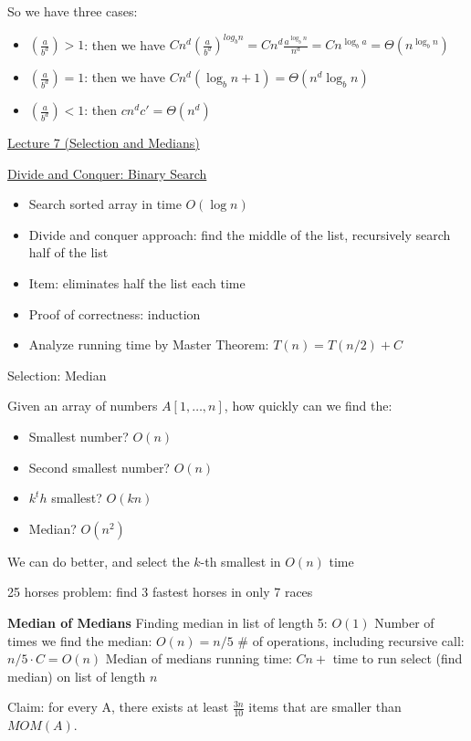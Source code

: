 \documentclass[12pt]{article}
\begin{document}
So we have three cases: \begin{itemize}
    \item $\left(\frac{a}{b^d}\right) > 1$: then we have $Cn^d \left(\frac{a}{b^d}\right)^{log_b n} = Cn^d \frac{a^{\log_bn}}{n^d} = Cn^{\log_b a} = \Theta(n^{\log_b n})$
    \item $\left(\frac{a}{b^d}\right) = 1$: then we have $Cn^d(\log_bn + 1) = \Theta(n^d \log_bn)$
    \item $\left(\frac{a}{b^d}\right) < 1$: then $cn^dc' = \Theta(n^d)$
\end{itemize}

\underline{Lecture 7 (Selection and Medians)}

\underline{Divide and Conquer: Binary Search}

\begin{itemize}
    \item Search sorted array in time $O(\log n)$
    \item Divide and conquer approach: find the middle of the list, recursively search half of the list
    \item Item: eliminates half the list each time
    \item Proof of correctness: induction
    \item Analyze running time by Master Theorem: $T(n) = T(n / 2) + C$
\end{itemize}

Selection: Median

Given an array of numbers $A[1, \ldots, n]$, how quickly can we find the: \begin{itemize}
    \item Smallest number? $O(n)$
    \item Second smallest number? $O(n)$
    \item $k^th$ smallest? $O(kn)$
    \item Median? $O(n^2)$
\end{itemize} We can do better, and select the $k$-th smallest in $O(n)$ time

25 horses problem: find 3 fastest horses in only 7 races

\textbf{Median of Medians}
Finding median in list of length 5: $O(1)$
Number of times we find the median: $O(n) = n / 5$
# of operations, including recursive call: $n / 5 \cdot C = O(n)$
Median of medians running time: $Cn + $ time to run select (find median) on list of length $n$

Claim: for every A, there exists at least $\frac{3n}{10}$ items that are smaller than $MOM(A)$.
\end{document}
